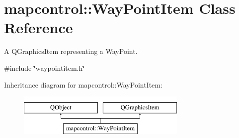 \hypertarget{classmapcontrol_1_1_way_point_item}{\section{mapcontrol\-:\-:Way\-Point\-Item Class Reference}
\label{classmapcontrol_1_1_way_point_item}
}


A Q\-Graphics\-Item representing a Way\-Point.  




{\ttfamily \#include \char`\"{}waypointitem.\-h\char`\"{}}

Inheritance diagram for mapcontrol\-:\-:Way\-Point\-Item\-:\begin{figure}[H]
\begin{center}
\leavevmode
\includegraphics[height=2.000000cm]{classmapcontrol_1_1_way_point_item}
\end{center}
\end{figure}
